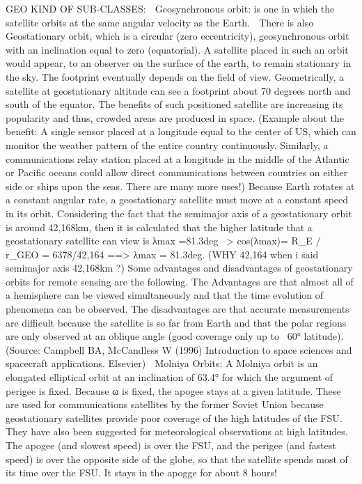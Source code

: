 GEO KIND OF SUB-CLASSES:
  Geosynchronous orbit:  is one in which the satellite orbits at the same angular velocity as the Earth.
  There is also Geostationary orbit, which is a circular (zero eccentricity), geosynchronous orbit with an inclination equal to zero (equatorial). A satellite placed in such an orbit would appear, to an observer on the surface of the earth, to remain stationary in the sky. The footprint eventually depends on the field of view. Geometrically, a satellite at geostationary altitude can see a footprint about 70 degrees north and south of the equator. The benefits of such positioned satellite are increasing  its popularity and thus, crowded areas are produced in space. (Example about the benefit: A single sensor placed at a longitude equal to the center of US, which can monitor the weather pattern of the entire country continuously. Similarly, a communications relay station placed at a longitude in the middle of the Atlantic or Pacific oceans could allow direct communications between countries on either side or ships upon the seas. There are many more uses!)
Because Earth rotates at a constant angular rate, a geostationary satellite must move at a constant speed in its orbit.
Considering the fact that the semimajor axis of a geostationary orbit is around 42,168km, then it is calculated that the higher latitude that a geostationary satellite can view is λmax =81.3deg --> cos(λmax)= R_E / r_GEO = 6378/42,164 ==> λmax = 81.3deg. (WHY 42,164 when i said semimajor axis 42,168km ?)
Some advantages and  disadvantages of geostationary orbits for remote sensing are the following. The Advantages are that almost all of a hemisphere can be viewed simultaneously and that the time evolution of phenomena can be observed. The disadvantages are that accurate measurements are difficult because the satellite is so far from Earth and that the polar regions are only observed at an oblique angle (good coverage only up to ~60° latitude).
(Source: Campbell BA, McCandless W (1996) Introduction to space sciences and spacecraft applications. Elsevier)
    Molniya Orbits: A Molniya orbit is an elongated elliptical orbit at an inclination of 63.4° for which the argument of perigee is fixed. Because ω is fixed, the apogee stays at a given latitude. These are used for communications satellites by the former Soviet Union because geostationary satellites provide poor coverage of the high latitudes of the FSU. They have also been suggested for meteorological observations at high latitudes. The apogee (and slowest speed) is over the FSU, and the perigee (and fastest speed) is over the opposite side of the globe, so that the satellite spends most of its time over the FSU. It stays in the apogge for about 8 hours!

